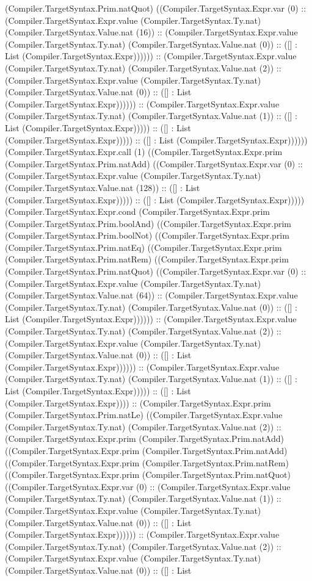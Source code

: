 \documentclass[11pt]{article}
\begin{document}
(Compiler.TargetSyntax.Prim.natQuot) ((Compiler.TargetSyntax.Expr.var (0) :: (Compiler.TargetSyntax.Expr.value (Compiler.TargetSyntax.Ty.nat) (Compiler.TargetSyntax.Value.nat (16)) :: (Compiler.TargetSyntax.Expr.value (Compiler.TargetSyntax.Ty.nat) (Compiler.TargetSyntax.Value.nat (0)) :: ([] : List (Compiler.TargetSyntax.Expr)))))) :: (Compiler.TargetSyntax.Expr.value (Compiler.TargetSyntax.Ty.nat) (Compiler.TargetSyntax.Value.nat (2)) :: (Compiler.TargetSyntax.Expr.value (Compiler.TargetSyntax.Ty.nat) (Compiler.TargetSyntax.Value.nat (0)) :: ([] : List (Compiler.TargetSyntax.Expr)))))) :: (Compiler.TargetSyntax.Expr.value (Compiler.TargetSyntax.Ty.nat) (Compiler.TargetSyntax.Value.nat (1)) :: ([] : List (Compiler.TargetSyntax.Expr))))) :: ([] : List (Compiler.TargetSyntax.Expr))))) :: ([] : List (Compiler.TargetSyntax.Expr)))))) (Compiler.TargetSyntax.Expr.call (1) ((Compiler.TargetSyntax.Expr.prim (Compiler.TargetSyntax.Prim.natAdd) ((Compiler.TargetSyntax.Expr.var (0) :: (Compiler.TargetSyntax.Expr.value (Compiler.TargetSyntax.Ty.nat) (Compiler.TargetSyntax.Value.nat (128)) :: ([] : List (Compiler.TargetSyntax.Expr))))) :: ([] : List (Compiler.TargetSyntax.Expr))))) (Compiler.TargetSyntax.Expr.cond (Compiler.TargetSyntax.Expr.prim (Compiler.TargetSyntax.Prim.boolAnd) ((Compiler.TargetSyntax.Expr.prim (Compiler.TargetSyntax.Prim.boolNot) ((Compiler.TargetSyntax.Expr.prim (Compiler.TargetSyntax.Prim.natEq) ((Compiler.TargetSyntax.Expr.prim (Compiler.TargetSyntax.Prim.natRem) ((Compiler.TargetSyntax.Expr.prim (Compiler.TargetSyntax.Prim.natQuot) ((Compiler.TargetSyntax.Expr.var (0) :: (Compiler.TargetSyntax.Expr.value (Compiler.TargetSyntax.Ty.nat) (Compiler.TargetSyntax.Value.nat (64)) :: (Compiler.TargetSyntax.Expr.value (Compiler.TargetSyntax.Ty.nat) (Compiler.TargetSyntax.Value.nat (0)) :: ([] : List (Compiler.TargetSyntax.Expr)))))) :: (Compiler.TargetSyntax.Expr.value (Compiler.TargetSyntax.Ty.nat) (Compiler.TargetSyntax.Value.nat (2)) :: (Compiler.TargetSyntax.Expr.value (Compiler.TargetSyntax.Ty.nat) (Compiler.TargetSyntax.Value.nat (0)) :: ([] : List (Compiler.TargetSyntax.Expr)))))) :: (Compiler.TargetSyntax.Expr.value (Compiler.TargetSyntax.Ty.nat) (Compiler.TargetSyntax.Value.nat (1)) :: ([] : List (Compiler.TargetSyntax.Expr))))) :: ([] : List (Compiler.TargetSyntax.Expr)))) :: (Compiler.TargetSyntax.Expr.prim (Compiler.TargetSyntax.Prim.natLe) ((Compiler.TargetSyntax.Expr.value (Compiler.TargetSyntax.Ty.nat) (Compiler.TargetSyntax.Value.nat (2)) :: (Compiler.TargetSyntax.Expr.prim (Compiler.TargetSyntax.Prim.natAdd) ((Compiler.TargetSyntax.Expr.prim (Compiler.TargetSyntax.Prim.natAdd) ((Compiler.TargetSyntax.Expr.prim (Compiler.TargetSyntax.Prim.natRem) ((Compiler.TargetSyntax.Expr.prim (Compiler.TargetSyntax.Prim.natQuot) ((Compiler.TargetSyntax.Expr.var (0) :: (Compiler.TargetSyntax.Expr.value (Compiler.TargetSyntax.Ty.nat) (Compiler.TargetSyntax.Value.nat (1)) :: (Compiler.TargetSyntax.Expr.value (Compiler.TargetSyntax.Ty.nat) (Compiler.TargetSyntax.Value.nat (0)) :: ([] : List (Compiler.TargetSyntax.Expr)))))) :: (Compiler.TargetSyntax.Expr.value (Compiler.TargetSyntax.Ty.nat) (Compiler.TargetSyntax.Value.nat (2)) :: (Compiler.TargetSyntax.Expr.value (Compiler.TargetSyntax.Ty.nat) (Compiler.TargetSyntax.Value.nat (0)) :: ([] : List 
\end{document}
